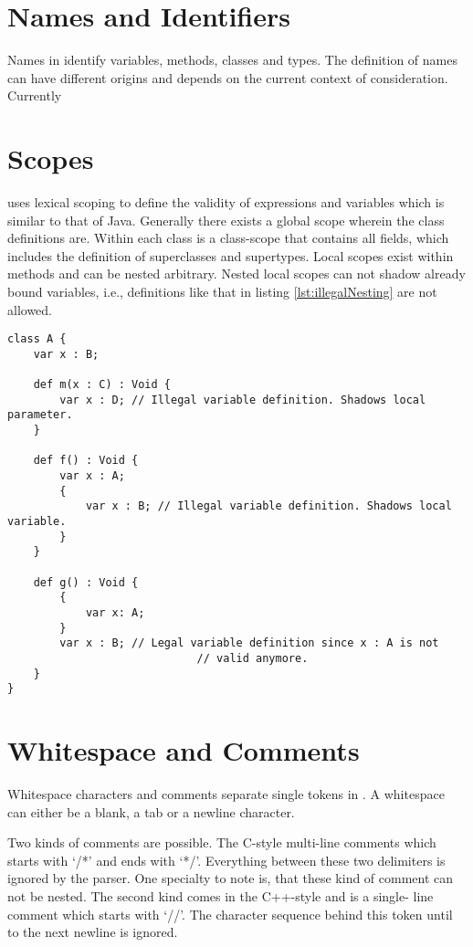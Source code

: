 \section{Names and Identifiers}
Names in \ooplss identify variables, methods, classes and types. The
definition of names can have different origins and depends on the current
context of consideration. Currently


\section{Scopes}
\ooplss uses lexical scoping to define the validity of expressions and 
variables which is similar to that of Java. Generally there exists a global
scope wherein the class definitions are. Within each class is a class-scope
that contains all fields, which includes the definition of superclasses and
supertypes. Local scopes exist within methods and can be nested arbitrary.
Nested local scopes can not shadow already bound variables, i.e., definitions
like that in listing \ref{lst:illegalNesting} are not allowed.

\begin{lstlisting}[float,language=ooplss,caption=Variable definition in local scope,label=lst:illegalNesting]
class A {
	var x : B;

	def m(x : C) : Void {
		var x : D; // Illegal variable definition. Shadows local parameter.
	}

	def f() : Void {
		var x : A; 
		{
			var x : B; // Illegal variable definition. Shadows local variable.
		}
	}

	def g() : Void {
		{
			var x: A;
		}
		var x : B; // Legal variable definition since x : A is not 
							 // valid anymore.
	}
}
\end{lstlisting}
\section{Whitespace and Comments}
Whitespace characters and comments separate single tokens in \ooplss. A
whitespace can either be a blank, a tab or a newline character.

Two kinds of comments are possible. The C-style multi-line comments which
starts with `/*' and ends with `*/'. Everything between these two delimiters
is ignored by the parser. One specialty to note is, that these kind of comment
can not be nested. The second kind comes in the C++-style and is a single-
line comment which starts with `//'. The character sequence behind this token
until to the next newline is ignored.

